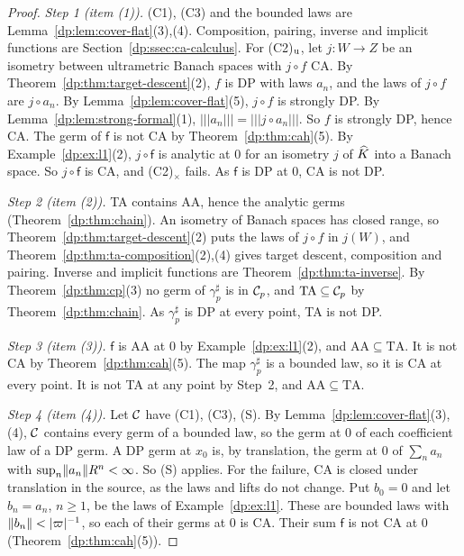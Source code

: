 \begin{proof}
\emph{Step 1 (item (1)).} (C1), (C3) and the bounded laws are Lemma~\ref{dp:lem:cover-flat}(3),(4). Composition, pairing, inverse and implicit functions are Section~\ref{dp:ssec:ca-calculus}. For (C2)$_{\rm u}$, let $j\colon W\to Z$ be an isometry between ultrametric Banach spaces with $j\circ f$ CA. By Theorem~\ref{dp:thm:target-descent}(2), $f$ is DP with laws $a_n$, and the laws of $j\circ f$ are $j\circ a_n$. By Lemma~\ref{dp:lem:cover-flat}(5), $j\circ f$ is strongly DP. By Lemma~\ref{dp:lem:strong-formal}(1), $\lvert\!\lvert\!\lvert a_n\rvert\!\rvert\!\rvert=\lvert\!\lvert\!\lvert j\circ a_n\rvert\!\rvert\!\rvert$. So $f$ is strongly DP, hence CA. The germ of $\mathsf f$ is not CA by Theorem~\ref{dp:thm:cah}(5). By Example~\ref{dp:ex:l1}(2), $j\circ\mathsf f$ is analytic at $0$ for an isometry $j$ of $\widehat K$ into a Banach space. So $j\circ\mathsf f$ is CA, and (C2)$_\times$ fails. As $\mathsf f$ is DP at $0$, CA is not DP.

\emph{Step 2 (item (2)).} TA contains AA, hence the analytic germs (Theorem~\ref{dp:thm:chain}). An isometry of Banach spaces has closed range, so Theorem~\ref{dp:thm:target-descent}(2) puts the laws of $j\circ f$ in $j(W)$, and Theorem~\ref{dp:thm:ta-composition}(2),(4) gives target descent, composition and pairing. Inverse and implicit functions are Theorem~\ref{dp:thm:ta-inverse}. By Theorem~\ref{dp:thm:cp}(3) no germ of $\gamma^\sharp_p$ is in $\mathcal{C}_p$, and $\mathrm{TA}\subseteq\mathcal{C}_p$ by Theorem~\ref{dp:thm:chain}. As $\gamma^\sharp_p$ is DP at every point, TA is not DP.

\emph{Step 3 (item (3)).} $\mathsf f$ is AA at $0$ by Example~\ref{dp:ex:l1}(2), and $\mathrm{AA}\subseteq\mathrm{TA}$. It is not CA by Theorem~\ref{dp:thm:cah}(5). The map $\gamma^\sharp_p$ is a bounded law, so it is CA at every point. It is not TA at any point by Step~2, and $\mathrm{AA}\subseteq\mathrm{TA}$.

\emph{Step 4 (item (4)).} Let $\mathcal{C}$ have (C1), (C3), (S). By Lemma~\ref{dp:lem:cover-flat}(3),(4), $\mathcal{C}$ contains every germ of a bounded law, so the germ at $0$ of each coefficient law of a DP germ. A DP germ at $x_0$ is, by translation, the germ at $0$ of $\sum_na_n$ with $\sup_n\lVert a_n\rVert R^n<\infty$. So (S) applies. For the failure, CA is closed under translation in the source, as the laws and lifts do not change. Put $b_0=0$ and let $b_n=a_n$, $n\ge1$, be the laws of Example~\ref{dp:ex:l1}. These are bounded laws with $\lVert b_n\rVert<\lvert \varpi\rvert^{-1}$, so each of their germs at $0$ is CA. Their sum $\mathsf f$ is not CA at $0$ (Theorem~\ref{dp:thm:cah}(5)).
\end{proof}

